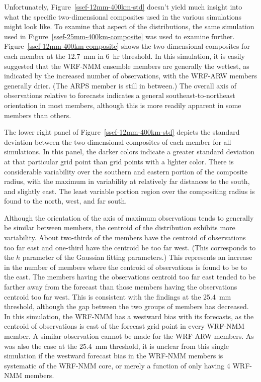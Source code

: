 Unfortunately, \mbox{Figure \ref{ssef-12mm-400km-std}} doesn't yield much insight into what the specific two-dimensional composites used in the various simulations might look like.
To examine that aspect of the distributions, the same simulation used in \mbox{Figure \ref{ssef-25mm-400km-composite}} was used to examine further.
\mbox{Figure \ref{ssef-12mm-400km-composite}} shows the two-dimensional composites for each member at the \mbox{12.7 mm} in \mbox{6 hr} threshold.
In this simulation, it is easily suggested that the WRF-NMM ensemble members are generally the wettest, as indicated by the increased number of observations, with the WRF-ARW members generally drier.
(The ARPS member is still in between.)
The overall axis of observations relative to forecasts indicates a general southeast-to-northeast orientation in most members, although this is more readily apparent in some members than others.


The lower right panel of \mbox{Figure \ref{ssef-12mm-400km-std}} depicts the standard deviation between the two-dimensional composites of each member for all simulations.
In this panel, the darker colors indicate a greater standard deviation at that particular grid point than grid points with a lighter color.
There is considerable variability over the southern and eastern portion of the composite radius, with the maximum in variability at relatively far distances to the south, and slightly east.
The least variable portion region over the compositing radius is found to the north, west, and far south.


Although the orientation of the axis of maximum observations tends to generally be similar between members, the centroid of the distribution exhibits more variability.
About two-thirds of the members have the centroid of observations too far east and one-third have the centroid be too far west.
(This corresponds to the $h$ parameter of the Gaussian fitting parameters.)
This represents an increase in the number of members where the centroid of observations is found to be to the east.
The members having the observations centroid too far east tended to be farther away from the forecast than those members having the observations centroid too far west.
This is consistent with the findings at the \mbox{25.4 mm} threshold, although the gap between the two groups of members has decreased.
In this simulation, the WRF-NMM has a westward bias with its forecasts, as the centroid of observations is east of the forecast grid point in every WRF-NMM member.
A similar observation cannot be made for the WRF-ARW members.
As was also the case at the \mbox{25.4 mm} threshold, it is unclear from this single simulation if the westward forecast bias in the WRF-NMM members is systematic of the WRF-NMM core, or merely a function of only having 4 WRF-NMM members.


